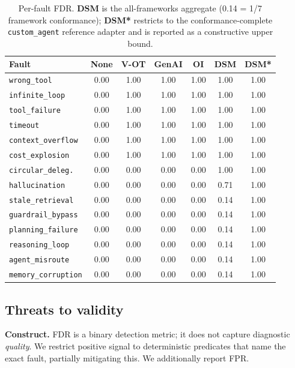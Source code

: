 \documentclass[sigconf,nonacm]{acmart}
\begin{document}
\begin{table}[h]
\centering
\caption{Per-fault FDR. \textbf{DSM} is the all-frameworks aggregate (0.14 = 1/7 framework conformance); \textbf{DSM*} restricts to the conformance-complete \texttt{custom\_agent} reference adapter and is reported as a constructive upper bound.}
\label{fig:perfault}
\footnotesize
\begin{tabular}{p{2.0cm} c c c c c c}
\toprule
\textbf{Fault} & \textbf{None} & \textbf{V-OT} & \textbf{GenAI} & \textbf{OI} & \textbf{DSM} & \textbf{DSM*} \\
\midrule
\texttt{wrong\_tool}        & 0.00 & 1.00 & 1.00 & 1.00 & 1.00 & 1.00 \\
\texttt{infinite\_loop}     & 0.00 & 1.00 & 1.00 & 1.00 & 1.00 & 1.00 \\
\texttt{tool\_failure}      & 0.00 & 1.00 & 1.00 & 1.00 & 1.00 & 1.00 \\
\texttt{timeout}            & 0.00 & 1.00 & 1.00 & 1.00 & 1.00 & 1.00 \\
\texttt{context\_overflow}  & 0.00 & 1.00 & 1.00 & 1.00 & 1.00 & 1.00 \\
\texttt{cost\_explosion}    & 0.00 & 1.00 & 1.00 & 1.00 & 1.00 & 1.00 \\
\midrule
\texttt{circular\_deleg.}   & 0.00 & 0.00 & 0.00 & 0.00 & 1.00 & 1.00 \\
\texttt{hallucination}      & 0.00 & 0.00 & 0.00 & 0.00 & 0.71 & 1.00 \\
\texttt{stale\_retrieval}   & 0.00 & 0.00 & 0.00 & 0.00 & 0.14 & 1.00 \\
\texttt{guardrail\_bypass}  & 0.00 & 0.00 & 0.00 & 0.00 & 0.14 & 1.00 \\
\texttt{planning\_failure}  & 0.00 & 0.00 & 0.00 & 0.00 & 0.14 & 1.00 \\
\texttt{reasoning\_loop}    & 0.00 & 0.00 & 0.00 & 0.00 & 0.14 & 1.00 \\
\texttt{agent\_misroute}    & 0.00 & 0.00 & 0.00 & 0.00 & 0.14 & 1.00 \\
\texttt{memory\_corruption} & 0.00 & 0.00 & 0.00 & 0.00 & 0.14 & 1.00 \\
\bottomrule
\end{tabular}
\end{table}

\subsection{Threats to validity}

\textbf{Construct.} FDR is a binary detection metric; it does not capture diagnostic \emph{quality}. We restrict positive signal to deterministic predicates that name the exact fault, partially mitigating this. We additionally report FPR.
\end{document}
